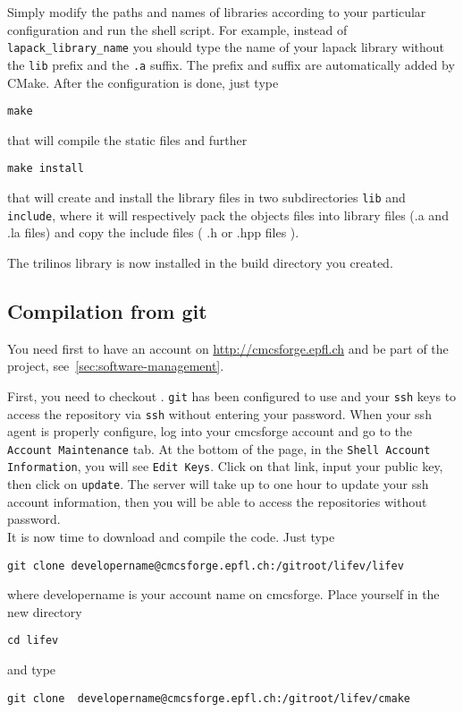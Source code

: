 Simply modify the paths and names of libraries according to your particular configuration and run the shell script.
For example, instead of \verb!lapack_library_name! you should type the name of your lapack library without the 
\verb!lib! prefix and the \verb!.a! suffix. The prefix and suffix are automatically added by CMake. 
After the configuration is done, just type
\begin{verbatim}
make 
\end{verbatim}
that  will compile the static files and further 
\begin{verbatim}
make install
\end{verbatim}
that will create and install the library files
in two subdirectories \verb|lib| and \verb|include|, where
it will respectively pack the objects files into library files (.a and .la files)
and copy the include files ( .h or .hpp files ).

The trilinos library is now installed in the build directory you created.

\subsection{Compilation from git}
\label{sec:compile-cvs}
You need first to have an account on \url{http://cmcsforge.epfl.ch} and
be part of the \lifev project, see~\ref{sec:software-management}.

First, you need to checkout \lifev. \verb!git! has
been configured to use  and your \verb!ssh! keys to
access the repository via \verb!ssh! without entering your password. When your ssh agent is properly configure, log into your cmcsforge account and
go to the \verb!Account Maintenance! tab. At the bottom of the page, in the
\verb!Shell Account Information!, you will see \verb!Edit Keys!. Click on that link,
input your public key, then click on \verb!update!. The server will take up to one
hour to update your ssh account information, then you will be able to access the
repositories without password.\\

It is now time to download and compile the code. 
Just type
\begin{verbatim}
git clone developername@cmcsforge.epfl.ch:/gitroot/lifev/lifev
\end{verbatim}
where developername is your account name on cmcsforge. Place yourself in the new directory

\begin{verbatim}
cd lifev
\end{verbatim}
and type
\begin{verbatim}
git clone  developername@cmcsforge.epfl.ch:/gitroot/lifev/cmake
\end{verbatim}

